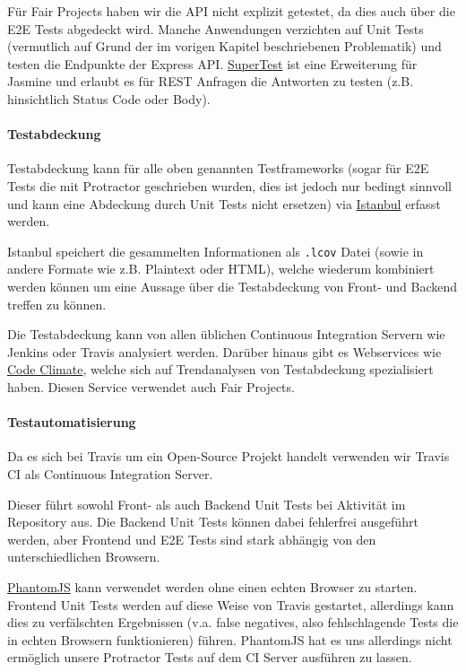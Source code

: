 \documentclass[]{article}
\begin{document}
Für Fair Projects haben wir die API nicht explizit getestet, da dies
auch über die E2E Tests abgedeckt wird. Manche Anwendungen verzichten
auf Unit Tests (vermutlich auf Grund der im vorigen Kapitel
beschriebenen Problematik) und testen die Endpunkte der Express API.
\href{https://github.com/visionmedia/supertest}{SuperTest} ist eine
Erweiterung für Jasmine und erlaubt es für REST Anfragen die Antworten
zu testen (z.B. hinsichtlich Status Code oder Body).

\paragraph{Testabdeckung}\label{testabdeckung}

Testabdeckung kann für alle oben genannten Testframeworks (sogar für E2E
Tests die mit Protractor geschrieben wurden, dies ist jedoch nur bedingt
sinnvoll und kann eine Abdeckung durch Unit Tests nicht ersetzen) via
\href{https://gotwarlost.github.io/istanbul/}{Istanbul} erfasst werden.

Istanbul speichert die gesammelten Informationen als \texttt{.lcov}
Datei (sowie in andere Formate wie z.B. Plaintext oder HTML), welche
wiederum kombiniert werden können um eine Aussage über die Testabdeckung
von Front- und Backend treffen zu können.

Die Testabdeckung kann von allen üblichen Continuous Integration Servern
wie Jenkins oder Travis analysiert werden. Darüber hinaus gibt es
Webservices wie
\href{https://codeclimate.com/github/mihaeu/fair-projects/coverage}{Code
Climate}, welche sich auf Trendanalysen von Testabdeckung spezialisiert
haben. Diesen Service verwendet auch Fair Projects.

\paragraph{Testautomatisierung}\label{testautomatisierung}

Da es sich bei Travis um ein Open-Source Projekt handelt verwenden wir
Travis CI als Continuous Integration Server.

Dieser führt sowohl Front- als auch Backend Unit Tests bei Aktivität im
Repository aus. Die Backend Unit Tests können dabei fehlerfrei
ausgeführt werden, aber Frontend und E2E Tests sind stark abhängig von
den unterschiedlichen Browsern.

\href{http://phantomjs.org/}{PhantomJS} kann verwendet werden ohne einen
echten Browser zu starten. Frontend Unit Tests werden auf diese Weise
von Travis gestartet, allerdings kann dies zu verfälschten Ergebnissen
(v.a. false negatives, also fehlschlagende Tests die in echten Browsern
funktionieren) führen. PhantomJS hat es uns allerdings nicht ermöglich
unsere Protractor Tests auf dem CI Server ausführen zu lassen.
\end{document}
